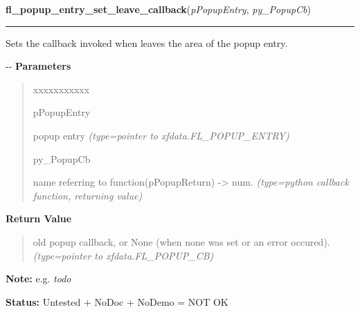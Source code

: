     \vspace{0.5ex}

\hspace{.8\funcindent}\begin{boxedminipage}{\funcwidth}

    \raggedright \textbf{fl\_popup\_entry\_set\_leave\_callback}(\textit{pPopupEntry}, \textit{py\_PopupCb})

    \vspace{-1.5ex}

    \rule{\textwidth}{0.5\fboxrule}
\setlength{\parskip}{2ex}

Sets the callback invoked when leaves the area of the popup entry.

-{}-
\setlength{\parskip}{1ex}
      \textbf{Parameters}
      \vspace{-1ex}

      \begin{quote}
        \begin{Ventry}{xxxxxxxxxxx}

          \item[pPopupEntry]


popup entry
            {\it (type=pointer to xfdata.FL\_POPUP\_ENTRY)}

          \item[py\_PopupCb]


name referring to function(pPopupReturn) -> num.
            {\it (type=python callback function, returning value)}

        \end{Ventry}

      \end{quote}

      \textbf{Return Value}
    \vspace{-1ex}

      \begin{quote}

old popup callback, or None (when none was set or an error
occured).
      {\it (type=pointer to xfdata.FL\_POPUP\_CB)}

      \end{quote}

\textbf{Note:} 
e.g. \emph{todo}


\textbf{Status:} 
Untested + NoDoc + NoDemo = NOT OK


    \end{boxedminipage}

    \label{xformslib:flpopup:fl_popup_entry_get_state}

